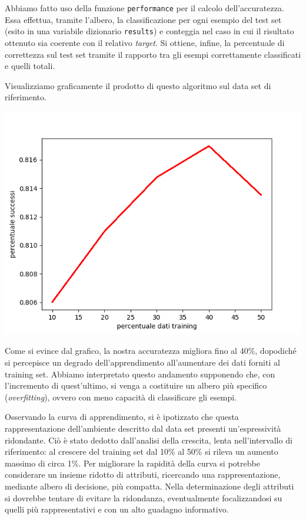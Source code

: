 			Abbiamo fatto uso della funzione \texttt{performance} per il calcolo dell'accuratezza. Essa effettua, tramite l'albero, la classificazione per ogni esempio del test set (esito in una variabile dizionario \texttt{results}) e conteggia nel caso in cui il risultato ottenuto sia coerente con il relativo \emph{target}. Si ottiene, infine, la percentuale di correttezza sul test set tramite il rapporto tra gli esempi correttamente classificati e quelli totali.\par
			Visualizziamo graficamente il prodotto di questo algoritmo sul data set di riferimento.
			
			\includegraphics[scale=0.86]{performance.png}
			 
			Come si evince dal grafico, la nostra accuratezza migliora fino al 40\%, dopodiché si percepisce un degrado dell'apprendimento all'aumentare dei dati forniti al training set. Abbiamo interpretato questo andamento supponendo che, con l'incremento di quest'ultimo, si venga a costituire un albero più specifico (\emph{overfitting}), ovvero con meno capacità di classificare gli esempi.\par
			Osservando la curva di apprendimento, si è ipotizzato che questa rappresentazione dell'ambiente descritto dal data set presenti un'espressività ridondante. Ciò è stato dedotto dall'analisi della crescita, lenta nell'intervallo di riferimento: al crescere del training set dal 10\% al 50\% si rileva un aumento massimo di circa 1\%. Per migliorare la rapidità della curva si potrebbe considerare un insieme ridotto di attributi, ricercando una rappresentazione, mediante albero di decisione, più compatta. Nella determinazione degli attributi si  dovrebbe tentare di evitare la ridondanza, eventualmente focalizzandosi su quelli più rappresentativi e con un alto guadagno informativo.
			
